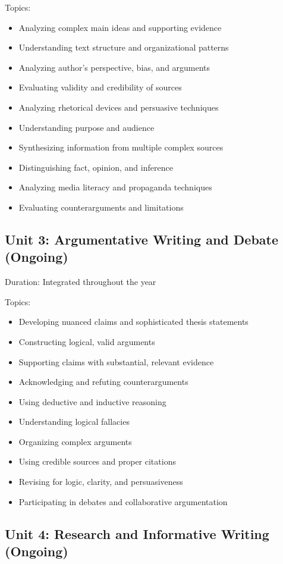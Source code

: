 \documentclass[11pt,letterpaper]{report}
\begin{document}
Topics:
\begin{itemize}
\item Analyzing complex main ideas and supporting evidence
\item Understanding text structure and organizational patterns
\item Analyzing author's perspective, bias, and arguments
\item Evaluating validity and credibility of sources
\item Analyzing rhetorical devices and persuasive techniques
\item Understanding purpose and audience
\item Synthesizing information from multiple complex sources
\item Distinguishing fact, opinion, and inference
\item Analyzing media literacy and propaganda techniques
\item Evaluating counterarguments and limitations
\end{itemize}

\subsection{Unit 3: Argumentative Writing and Debate (Ongoing)}

Duration: Integrated throughout the year

Topics:
\begin{itemize}
\item Developing nuanced claims and sophisticated thesis statements
\item Constructing logical, valid arguments
\item Supporting claims with substantial, relevant evidence
\item Acknowledging and refuting counterarguments
\item Using deductive and inductive reasoning
\item Understanding logical fallacies
\item Organizing complex arguments
\item Using credible sources and proper citations
\item Revising for logic, clarity, and persuasiveness
\item Participating in debates and collaborative argumentation
\end{itemize}

\subsection{Unit 4: Research and Informative Writing (Ongoing)}
\end{document}
